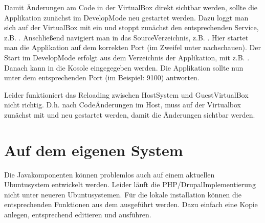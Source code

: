 \documentclass[letterpaper,10pt,english]{sphinxmanual}
\begin{document}
\sphinxAtStartPar
Damit Änderungen am Code in der VirtualBox direkt sichtbar werden,
sollte die Applikation zunächst im Develop\sphinxhyphen{}Mode neu gestartet werden.
Dazu loggt man sich auf der VirtualBox mit  ein und
stoppt zunächst den entsprechenden Service, z.B.
. Anschließend navigiert man in das
Source\sphinxhyphen{}Verzeichnis, z.B. . Hier startet
man die Applikation auf dem korrekten Port (im Zweifel unter
 nachschauen). Der
Start im Develop\sphinxhyphen{}Mode erfolgt aus dem Verzeichnis der Applikation, mit
z.B. . Danach
kann in die Kosole  eingegegeben werden. Die Applikation sollte
nun unter dem entsprechenden Port (im Beispiel: 9100) antworten.

\sphinxAtStartPar
Leider funktioniert das Reloading zwischen Host\sphinxhyphen{}System und
Guest\sphinxhyphen{}VirtualBox nicht richtig. D.h. nach Code\sphinxhyphen{}Änderungen im Host, muss
auf der Virtualbox zunächst mit  und  neu gestartet
werden, damit die Änderungen sichtbar werden.


\section{Auf dem eigenen System}
\label{\detokenize{toscience:auf-dem-eigenen-system}}\label{\detokenize{toscience:id62}}
\sphinxAtStartPar
Die Javakomponenten können problemlos auch auf einem aktuellen
Ubuntusystem entwickelt werden. Leider läuft die
PHP/Drupal\sphinxhyphen{}Implementierung nicht unter neueren Ubuntusystemen. Für die
lokale installation können die entsprechenden Funktionen aus dem
 ausgeführt werden. Dazu einfach eine Kopie anlegen,
entsprechend editieren und ausführen.
\end{document}
